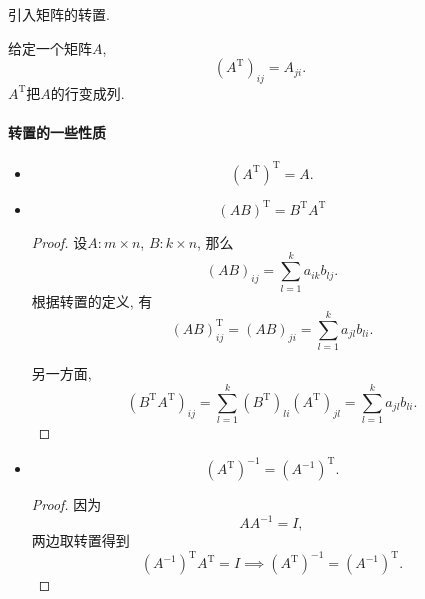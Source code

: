 

引入矩阵的转置.
\begin{definition}
    给定一个矩阵$A$,
    \begin{equation}
      \left( A^{\mathrm{T}} \right) _{ij}=A_{ji}.
    \end{equation}
    $A^{\mathrm{T}}$把$A$的行变成列.
\end{definition}

\paragraph{转置的一些性质}
\begin{itemize}
    \item \begin{equation}
        \left( A^{\mathrm{T}} \right) ^{\mathrm{T}} = A.
      \end{equation}
    
    \item \begin{equation}
        \left( AB \right) ^{\mathrm{T}} = B^{\mathrm{T}}A^{\mathrm{T}}
      \end{equation}
    \begin{proof}
          设$A\colon m \times n$, $B\colon k \times n$, 那么
          \begin{equation}
            \left( AB \right) _{ij} = \sum_{l=1}^{k} a_{ik}b_{lj}.
          \end{equation}
          根据转置的定义, 有
          \begin{equation}
            \left( AB \right) ^{\mathrm{T}}_{ij} = \left( AB \right) _{ji} = \sum_{l=1}^{k} a_{jl} b_{li}.
          \end{equation}
      
          另一方面,
          \begin{equation}
            \left( B^{\mathrm{T}}A^{\mathrm{T}} \right) _{ij} = \sum_{l=1}^{k} \left( B^{\mathrm{T}} \right) _{li} \left( A^{\mathrm{T}} \right) _{jl} = \sum_{l=1}^{k} a_{jl} b_{li}.
          \end{equation}
    \end{proof}

    \item \begin{equation}
        \left( A^{\mathrm{T}} \right) ^{-1} = \left( A^{-1} \right) ^{\mathrm{T}}.
      \end{equation}
      \begin{proof}
          因为
          \begin{equation}
            A A^{-1} = I,
          \end{equation}
          两边取转置得到
          \begin{equation}
            \left( A^{-1} \right) ^{\mathrm{T}} A^{\mathrm{T}} = I \implies \left( A^{\mathrm{T}} \right) ^{-1} = \left( A^{-1} \right) ^{\mathrm{T}}.
          \end{equation}
      \end{proof}
\end{itemize}


